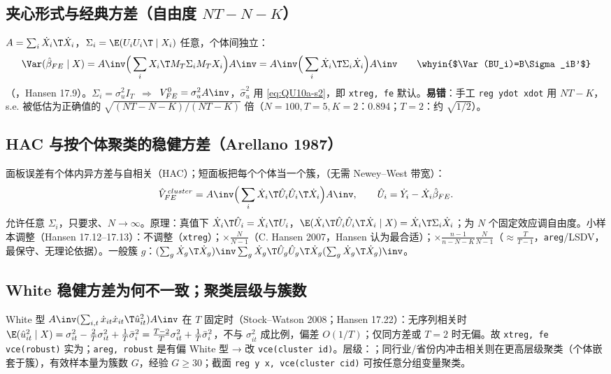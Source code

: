 \subsection{夹心形式与经典方差（自由度 \texorpdfstring{$NT-N-K$}{NT-N-K}）}
$A=\sum_i\dot X_i\T\dot X_i$，$\Sigma_i=\E(U_iU_i\T\mid X_i)$ 任意，个体间独立：
\[
\Var(\hat\beta_{FE}\mid X)=A\inv\Big(\sum_iX_i\T M_T\Sigma_iM_TX_i\Big)A\inv=A\inv\Big(\sum_i\dot X_i\T\Sigma_i\dot X_i\Big)A\inv\qquad\text{\whyin{$\Var(BU_i)=B\Sigma_iB'$}}
\]
（，Hansen 17.9）。$\Sigma_i=\sigma_u^2I_T$\ $\Rightarrow$\ $V^0_{FE}=\sigma_u^2A\inv$，$\hat\sigma_u^2$ 用 \eqref{eq:QU10a-s2}，即 \texttt{xtreg, fe} 默认。\textbf{易错}：手工 \texttt{reg ydot xdot} 用 $NT-K$，s.e. 被低估为正确值的 $\sqrt{(NT-N-K)/(NT-K)}$ 倍（$N=100,T=5,K=2$：0.894；$T=2$：约 $\sqrt{1/2}$）。

\subsection{HAC 与按个体聚类的稳健方差（Arellano 1987）}
面板误差有个体内异方差与自相关（HAC）；短面板把每个个体当一个簇，（无需 Newey–West 带宽）：
\begin{equation}\label{eq:QU10a-cluster}
\hat V^{\,cluster}_{FE}=A\inv\Big(\sum_i\dot X_i\T\hat U_i\hat U_i\T\dot X_i\Big)A\inv,\qquad \hat U_i=\dot Y_i-\dot X_i\hat\beta_{FE}.
\end{equation}
允许任意 $\Sigma_i$，只要求、$N\to\infty$。原理：真值下 $\dot X_i\T\hat U_i=\dot X_i\T U_i$，$\E(\dot X_i\T\hat U_i\hat U_i\T\dot X_i\mid X)=\dot X_i\T\Sigma_i\dot X_i$；为 $N$ 个固定效应调自由度。小样本调整（Hansen 17.12–17.13）：不调整（\texttt{xtreg}）；$\times\frac N{N-1}$（C. Hansen 2007，Hansen 认为最合适）；$\times\frac{n-1}{n-N-K}\frac N{N-1}$（$\approx\frac T{T-1}$，\texttt{areg}/LSDV，最保守、无理论依据）。一般簇 $g$：$(\sum_g\dot X_g\T\dot X_g)\inv\sum_g\dot X_g\T\hat U_g\hat U_g\T\dot X_g(\sum_g\dot X_g\T\dot X_g)\inv$。

\subsection{White 稳健方差为何不一致；聚类层级与簇数}
White 型 $A\inv(\sum_{i,t}\dot x_{it}\dot x_{it}\T\hat u_{it}^2)A\inv$ 在 $T$ 固定时（Stock–Watson 2008；Hansen 17.22）：无序列相关时
$\E(\hat u_{it}^2\mid X)=\sigma_{it}^2-\frac2T\sigma_{it}^2+\frac1T\bar\sigma_i^2=\frac{T-2}T\sigma_{it}^2+\frac1T\bar\sigma_i^2$，不与 $\sigma_{it}^2$ 成比例，偏差 $O(1/T)$；仅同方差或 $T=2$ 时无偏。故 \texttt{xtreg, fe vce(robust)} 实为；\texttt{areg, robust} 是有偏 White 型 → 改 \texttt{vce(cluster id)}。层级：；同行业/省份内冲击相关则在更高层级聚类（个体嵌套于簇），有效样本量为簇数 $G$，经验 $G\ge30$；截面 \texttt{reg y x, vce(cluster cid)} 可按任意分组变量聚类。

